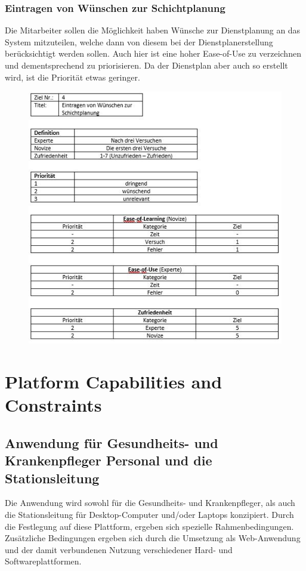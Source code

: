 \documentclass[11pt,
paper=a4,
bibtotocnumbered,	  %
liststotocnumbered,  %
DIV=calc,		  %
tablecaptionabove,	  %
headinclude,
]{article}
\begin{document}
\subsubsection{Eintragen von Wünschen zur Schichtplanung}
Die Mitarbeiter sollen die Möglichkeit haben Wünsche zur Dienstplanung an das System mitzuteilen, welche dann von diesem bei der Dienstplanerstellung berücksichtigt werden sollen. Auch hier ist eine hoher Ease-of-Use zu verzeichnen und dementsprechend zu priorisieren. Da der Dienstplan aber auch so erstellt wird, ist die Priorität etwas geringer.
\begin{figure}[H]
\includegraphics[width=1\textwidth]{Bilder/wuensche.jpg}
\end{figure}
\section{Platform Capabilities and Constraints}
\subsection{Anwendung für Gesundheits- und Krankenpfleger Personal und die Stationsleitung}
Die Anwendung wird sowohl für die Gesundheits- und Krankenpfleger, als auch die Stationsleitung für Desktop-Computer und/oder Laptops konzipiert. Durch die Festlegung auf diese Plattform, ergeben sich spezielle Rahmenbedingungen. Zusätzliche Bedingungen ergeben sich durch die Umsetzung als Web-Anwendung und der damit verbundenen Nutzung verschiedener Hard- und Softwareplattformen.
\end{document}
